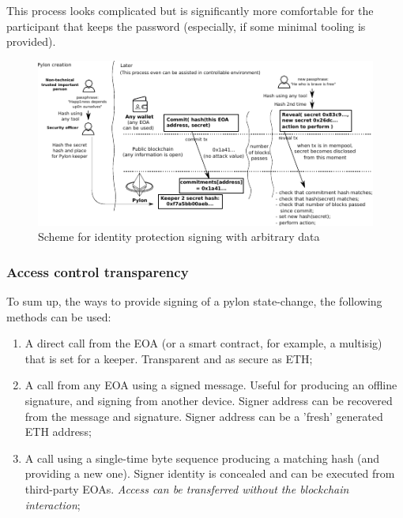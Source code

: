 \documentclass[12pt]{article}
\begin{document}
This process looks complicated but is significantly more comfortable for the participant that keeps the password (especially, if some minimal tooling is provided).


\begin{figure}[h]
  \hspace*{-2cm}
    \includegraphics[width=1.35\textwidth]{pylon_identity_protection.pdf}
    \caption[Figure 1]{Scheme for identity protection signing with arbitrary data\label{fig:identity_protection}}
\end{figure}



\bigskip

\subsubsection{Access control transparency}


To sum up, the ways to provide signing of a pylon state-change, the following methods can be used:
\begin{enumerate}
\item{A direct call from the EOA (or a smart contract, for example, a multisig) that is set for a keeper. Transparent and as secure as ETH;}
\item{A call from any EOA using a signed message. Useful for producing an offline signature, and signing from another device. Signer address can be recovered from the message and signature. Signer address can be a 'fresh' generated ETH address;}
\item{A call using a single-time byte sequence producing a matching hash (and providing a new one). Signer identity is concealed and can be executed from third-party EOAs. \emph{Access can be transferred without the blockchain interaction};}
\end{enumerate}
\end{document}
